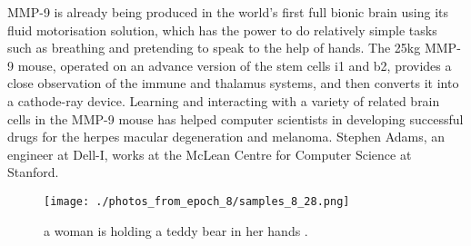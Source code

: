 \documentclass{article}%
\begin{document}
MMP{-}9 is already being produced in the world's first full bionic brain using its fluid motorisation solution, which has the power to do relatively simple tasks such as breathing and pretending to speak to the help of hands.\newline%
The 25kg MMP{-}9 mouse, operated on an advance version of the stem cells i1 and b2, provides a close observation of the immune and thalamus systems, and then converts it into a cathode{-}ray device. Learning and interacting with a variety of related brain cells in the MMP{-}9 mouse has helped computer scientists in developing successful drugs for the herpes macular degeneration and melanoma.\newline%
Stephen Adams, an engineer at Dell{-}I, works at the McLean Centre for Computer Science at Stanford.\newline%

%


\begin{figure}[h!]%
\centering%
\texttt{[image: ./photos\_from\_epoch\_8/samples\_8\_28.png]}%
\caption{a woman is holding a teddy bear in her hands .}%
\end{figure}

%
\end{document}
